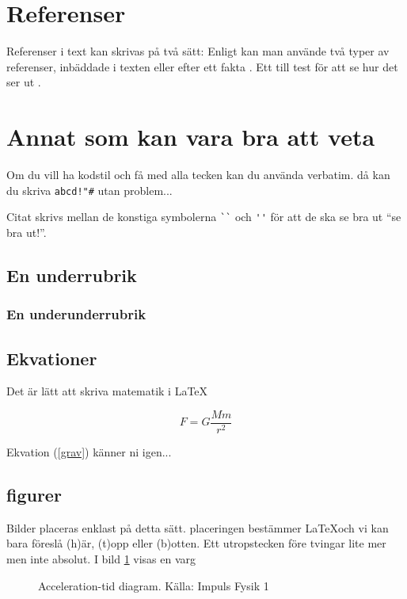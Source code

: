 \documentclass[11p]{article}
\begin{document}

    \section{Referenser}
    Referenser i text kan skrivas på två sätt: Enligt \textcite{Jens} kan man använde två typer av referenser, inbäddade i texten eller efter ett fakta \parencite{Fraenkel}. Ett till test för att se hur det ser ut \parencite[sid 55]{fermi}.

    \section{Annat som kan vara bra att veta}
    Om du vill ha kodstil och få med alla tecken kan du använda verbatim. då kan du skriva \verb|abcd!"#| utan problem...

    Citat skrivs mellan de konstiga symbolerna \verb|``| och \verb|''| för att de ska se bra ut ``se bra ut!''.
    \subsection{En underrubrik}
    \subsubsection{En underunderrubrik}
    \subsection{Ekvationer}
    Det är lätt att skriva matematik i \LaTeX

    \begin{equation}
        F = G \frac{M m}{r^2}
        \label{grav}
    \end{equation}

    Ekvation (\ref{grav}) känner ni igen...

    \subsection{figurer}
    Bilder placeras enklast på detta sätt. placeringen bestämmer \LaTeX och vi kan bara föreslå (h)är, (t)opp eller (b)otten. Ett utropstecken före tvingar lite mer men inte absolut. I bild \ref{varg} visas en varg
    \begin{figure}[!h]
        \caption{Acceleration-tid diagram. Källa: Impuls Fysik 1}
        \label{varg}
    \end{figure}
    \printbibliography
\end{document}
